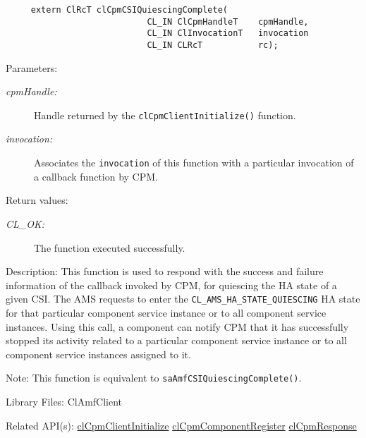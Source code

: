 {\begin{Desc}
\footnotesize\begin{verbatim}     extern ClRcT clCpmCSIQuiescingComplete(
                			CL_IN ClCpmHandleT    cpmHandle,
                			CL_IN ClInvocationT   invocation
                			CL_IN CLRcT           rc);
\end{verbatim}
\normalsize
\end{Desc}
\begin{Desc}
\item[Parameters:]
\begin{description}
\item[{\em cpm\-Handle:}]Handle returned by the {\tt{cl\-Cpm\-Client\-Initialize()}} function. 
\item[{\em invocation:}]Associates the {\tt{invocation}} of this function with a particular invocation of a callback function by CPM.
\end{description}
\end{Desc}
\begin{Desc}
\item[Return values:]
\begin{description}
\item[{\em CL\_\-OK:}]The function executed successfully.\end{description}
\end{Desc}
\begin{Desc}
\item[Description:]This function is used to respond with the success and failure information of the callback invoked by CPM, for quiescing the HA state 
of a given CSI. The AMS requests to enter the {\tt{CL\_\-AMS\_\-HA\_\-STATE\_\-QUIESCING}} HA state for that particular component service instance or to
all component service instances. Using this call, a component can notify CPM that it has successfully stopped its activity related to a particular
component service instance or to all component service instances assigned to it. \end{Desc}
\begin{Desc}
\item[Note:]This function is equivalent to {\tt{sa\-Amf\-CSIQuiescing\-Complete()}}.\end{Desc}
\begin{Desc}
\item[Library Files:]Cl\-Amf\-Client\end{Desc}

\begin{Desc}
\item[Related API(s):]\hyperlink{group__group14}{cl\-Cpm\-Client\-Initialize} \hyperlink{group__group14}{cl\-Cpm\-Component\-Register} \hyperlink{group__group14}{cl\-Cpm\-Response} \end{Desc}

}
